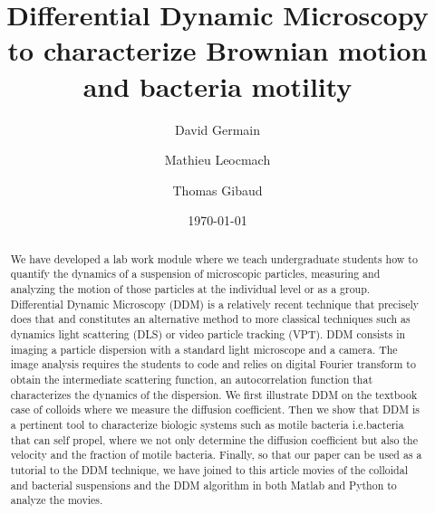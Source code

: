 \documentclass[prb,twocolumn,amsmath,amssymb]{revtex4-1}
\begin{document}

\title[Differential Dynamic Microscopy to characterize Brownian motion and bacteria motility]{Differential Dynamic Microscopy\\ to characterize Brownian motion and bacteria motility}%

\author{David Germain}
\author{Mathieu Leocmach}
\author{Thomas Gibaud}

\date{\today}%

\begin{abstract}
We have developed a lab work module where we teach undergraduate students how to quantify the dynamics of a suspension of microscopic particles, measuring and analyzing the motion of those particles at the individual level or as a group. 
Differential Dynamic Microscopy (DDM) is a relatively recent technique that precisely does that and constitutes an alternative method to more classical techniques such as dynamics light scattering (DLS) or video particle tracking (VPT). DDM consists in imaging a particle dispersion with a standard light microscope and a camera. The image analysis requires the students to code and relies on digital Fourier transform to obtain the intermediate scattering function, an autocorrelation function that characterizes the dynamics of the dispersion. We first illustrate DDM on the textbook case of colloids where we measure the diffusion coefficient. Then we show that DDM is a pertinent tool to characterize biologic systems such as motile bacteria i.e.bacteria that can self propel, where we not only determine the diffusion coefficient but also the velocity and the fraction of motile bacteria. Finally, so that  our paper can be used as a tutorial to the DDM technique, we have joined to this article movies of the colloidal and bacterial suspensions and the DDM algorithm in both Matlab and Python to analyze the movies.
\end{abstract}

\maketitle
\end{document}
